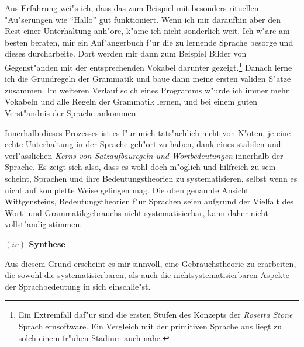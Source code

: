 \documentclass[a4paper, emulatestandardclasses, 12pt]{scrartcl}
\begin{document}
\begin{onehalfspace}
Aus Erfahrung wei"s ich, dass das zum Beispiel mit besonders rituellen "Au"serungen wie "`Hallo"' gut funktioniert. Wenn ich mir daraufhin aber den Rest einer Unterhaltung anh"ore, k"ame ich nicht sonderlich weit. Ich w"are am besten beraten, mir ein Anf"angerbuch f"ur die zu lernende Sprache besorge und dieses durcharbeite. Dort werden mir dann zum Beispiel Bilder von Gegenst"anden mit der entsprechenden Vokabel darunter gezeigt.\footnote{Ein Extremfall daf"ur sind die ersten Stufen des Konzepts der \emph{Rosetta Stone} Sprachlernsoftware. Ein Vergleich mit der primitiven Sprache aus \cite[PU \S 2]{wittgenstein1963tractatus} liegt zu solch einem fr"uhen Stadium auch nahe.} Danach lerne ich die Grundregeln der Grammatik und baue dann meine ersten validen S"atze zusammen. Im weiteren Verlauf solch eines Programms w"urde ich immer mehr Vokabeln und alle Regeln der Grammatik lernen, und bei einem guten Verst"andnis der Sprache ankommen. 

Innerhalb dieses Prozesses ist es f"ur mich tats"achlich nicht von N"oten, je eine echte Unterhaltung in der Sprache geh"ort zu haben, dank eines stabilen und verl"asslichen \emph{Kerns von Satzaufbauregeln und Wortbedeutungen} innerhalb der Sprache. Es zeigt sich also, dass es wohl doch m"oglich und hilfreich zu sein scheint, Sprachen und ihre Bedeutungstheorien zu systematisieren, selbst wenn es nicht auf komplette Weise gelingen mag. Die oben genannte Ansicht Wittgensteins, Bedeutungstheorien f"ur Sprachen seien aufgrund der Vielfalt des Wort- und Grammatikgebrauchs nicht systematisierbar, kann daher nicht vollst"andig stimmen.

\vspace{5mm}
\noindent\textbf{$(iv)$ Synthese}	

\noindent Aus diesem Grund erscheint es mir sinnvoll, eine Gebrauchstheorie zu erarbeiten, die sowohl die systematisierbaren, als auch die nichtsystematisierbaren Aspekte der Sprachbedeutung in sich einschlie"st.  

\end{onehalfspace}


\end{document}
